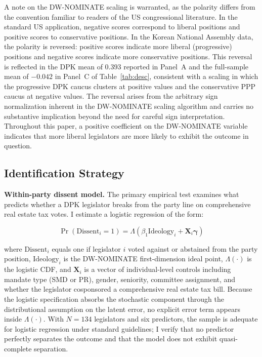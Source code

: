 \documentclass[11pt]{article}
\begin{document}
A note on the DW-NOMINATE scaling is warranted, as the polarity differs from the convention familiar to readers of the US congressional literature. In the standard US application, negative scores correspond to liberal positions and positive scores to conservative positions. In the Korean National Assembly data, the polarity is reversed: positive scores indicate more liberal (progressive) positions and negative scores indicate more conservative positions. This reversal is reflected in the DPK mean of 0.393 reported in Panel~A and the full-sample mean of $-0.042$ in Panel~C of Table~\ref{tab:desc}, consistent with a scaling in which the progressive DPK caucus clusters at positive values and the conservative PPP caucus at negative values. The reversal arises from the arbitrary sign normalization inherent in the DW-NOMINATE scaling algorithm and carries no substantive implication beyond the need for careful sign interpretation. Throughout this paper, a positive coefficient on the DW-NOMINATE variable indicates that more liberal legislators are more likely to exhibit the outcome in question.

\subsection{Identification Strategy}

\textbf{Within-party dissent model.} The primary empirical test examines what predicts whether a DPK legislator breaks from the party line on comprehensive real estate tax votes. I estimate a logistic regression of the form:

\begin{equation}
\Pr(\text{Dissent}_{i} = 1) = \Lambda\!\left(\beta_1 \text{Ideology}_{i} + \mathbf{X}_{i} \boldsymbol{\gamma}\right)
\label{eq:dissent}
\end{equation}

\noindent where $\text{Dissent}_{i}$ equals one if legislator $i$ voted against or abstained from the party position, $\text{Ideology}_{i}$ is the DW-NOMINATE first-dimension ideal point, $\Lambda(\cdot)$ is the logistic CDF, and $\mathbf{X}_{i}$ is a vector of individual-level controls including mandate type (SMD or PR), gender, seniority, committee assignment, and whether the legislator cosponsored a comprehensive real estate tax bill. Because the logistic specification absorbs the stochastic component through the distributional assumption on the latent error, no explicit error term appears inside $\Lambda(\cdot)$. With $N = 134$ legislators and six predictors, the sample is adequate for logistic regression under standard guidelines; I verify that no predictor perfectly separates the outcome and that the model does not exhibit quasi-complete separation.
\end{document}
